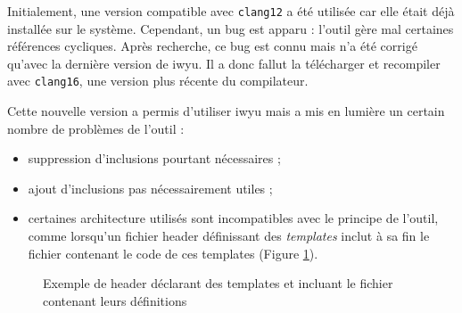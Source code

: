 \documentclass[a4paper,11pt]{report}
\begin{document}
Initialement, une version compatible avec \verb'clang12' a été utilisée car elle était déjà installée sur le système.
Cependant, un bug est apparu : l'outil gère mal certaines références cycliques.
Après recherche, ce bug  est connu mais n'a été corrigé qu'avec la dernière version de iwyu.
Il a donc fallut la télécharger et recompiler avec \verb'clang16', une version plus récente du compilateur.

Cette nouvelle version a permis d'utiliser iwyu mais a mis en lumière un certain nombre de problèmes de l'outil :
\begin{itemize}
    \item suppression d'inclusions pourtant nécessaires ;
    \item ajout d'inclusions pas nécessairement utiles ;
    \item certaines architecture utilisés sont incompatibles avec le principe de l'outil, comme lorsqu'un fichier header définissant des \emph{templates} inclut à sa fin le fichier contenant le code de ces templates (Figure \ref{iwyu_templates}).
\end{itemize}

\begin{figure}[H]
    \begin{center}
        \caption{Exemple de header déclarant des templates et incluant le fichier contenant leurs définitions}
        \label{iwyu_templates}
    \end{center}
\end{figure}
\end{document}
